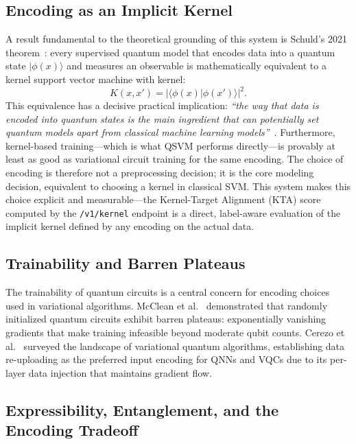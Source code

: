 \documentclass[sigconf,nonacm]{acmart}
\begin{document}
\subsection{Encoding as an Implicit Kernel}

A result fundamental to the theoretical grounding of this system is Schuld's 2021
theorem~\cite{schuld2021_kernel}: every supervised quantum model that encodes data
into a quantum state $|\phi(x)\rangle$ and measures an observable is mathematically
equivalent to a kernel support vector machine with kernel:
\begin{equation}
  K(x, x') = |\langle\phi(x)|\phi(x')\rangle|^2.
  \label{eq:kernel}
\end{equation}
This equivalence has a decisive practical implication: \emph{``the way that data is
encoded into quantum states is the main ingredient that can potentially set quantum
models apart from classical machine learning models''}~\cite{schuld2021_kernel}.
Furthermore, kernel-based training---which is what QSVM performs directly---is
provably at least as good as variational circuit training for the same encoding. The
choice of encoding is therefore not a preprocessing decision; it is the core
modeling decision, equivalent to choosing a kernel in classical SVM. This system
makes this choice explicit and measurable---the Kernel-Target Alignment (KTA) score
computed by the \texttt{/v1/kernel} endpoint is a direct, label-aware evaluation of
the implicit kernel defined by any encoding on the actual data.

\subsection{Trainability and Barren Plateaus}

The trainability of quantum circuits is a central concern for encoding choices used
in variational algorithms. McClean et al.~\cite{mcclean2018} demonstrated that
randomly initialized quantum circuits exhibit barren plateaus: exponentially
vanishing gradients that make training infeasible beyond moderate qubit counts.
Cerezo et al.~\cite{cerezo2021} surveyed the landscape of variational quantum
algorithms, establishing data re-uploading as the preferred input encoding for QNNs
and VQCs due to its per-layer data injection that maintains gradient flow.

\subsection{Expressibility, Entanglement, and the Encoding Tradeoff}
\end{document}

